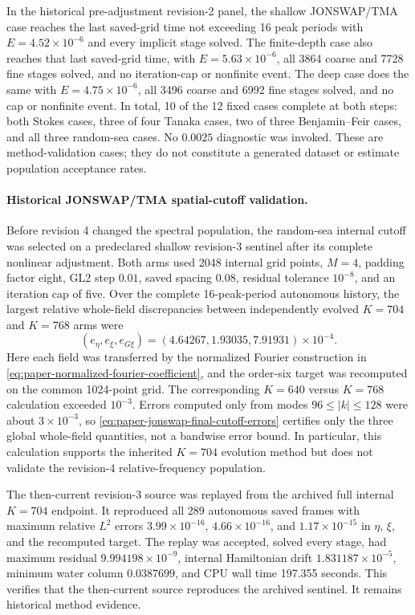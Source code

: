 In the historical pre-adjustment revision-2 panel, the shallow JONSWAP/TMA
case reaches the last saved-grid time not exceeding
16 peak periods with
$E=4.52\times10^{-6}$ and every implicit stage solved.  The finite-depth case
also reaches that last saved-grid time, with $E=5.63\times10^{-6}$, all 3864
coarse and 7728 fine stages solved, and no iteration-cap or nonfinite event.
The deep case does the same with $E=4.75\times10^{-6}$, all 3496 coarse and
6992 fine stages solved, and no cap or nonfinite event.  In total, 10 of the
12 fixed cases complete at both steps: both Stokes cases, three of four Tanaka
cases, two of three Benjamin--Feir cases, and all three random-sea cases.  No
\(0.0025\) diagnostic was invoked.  These are method-validation cases; they
do not constitute a generated dataset or estimate population acceptance
rates.

\paragraph{Historical JONSWAP/TMA spatial-cutoff validation.}
Before revision 4 changed the spectral population, the random-sea internal
cutoff was selected on a predeclared shallow revision-3 sentinel after its
complete nonlinear adjustment.  Both arms used 2048 internal grid
points, \(M=4\), padding factor eight, GL2 step \(0.01\), saved spacing
\(0.08\), residual tolerance \(10^{-8}\), and an iteration cap of five.  Over
the complete 16-peak-period autonomous history, the largest relative
whole-field discrepancies between independently evolved \(K=704\) and
\(K=768\) arms were
\begin{equation}
  (e_\eta,e_\xi,e_{G\xi})
  =(4.64267,1.93035,7.91931)\times10^{-4}.
  \label{eq:paper-jonswap-final-cutoff-errors}
\end{equation}
Here each field was transferred by the normalized Fourier construction in
\cref{eq:paper-normalized-fourier-coefficient}, and the order-six target was
recomputed on the common 1024-point grid.  The corresponding \(K=640\) versus
\(K=768\) calculation exceeded \(10^{-3}\).  Errors computed only from modes
\(96\le |k|\le128\) were about \(3\times10^{-3}\), so
\cref{eq:paper-jonswap-final-cutoff-errors} certifies only the three global
whole-field quantities, not a bandwise error bound.  In particular, this
calculation supports the inherited \(K=704\) evolution method but does not
validate the revision-4 relative-frequency population.

The then-current revision-3 source was replayed from the archived full
internal \(K=704\) endpoint.  It reproduced all 289 autonomous saved frames
with maximum relative \(L^2\) errors
\(3.99\times10^{-16}\), \(4.66\times10^{-16}\), and
\(1.17\times10^{-15}\) in \(\eta\), \(\xi\), and the recomputed target.  The
replay was accepted, solved every stage, had maximum residual
\(9.994198\times10^{-9}\), internal Hamiltonian drift
\(1.831187\times10^{-5}\), minimum water column \(0.0387699\), and CPU wall
time 197.355 seconds.  This verifies that the then-current source reproduces
the archived sentinel.  It remains historical method evidence.

